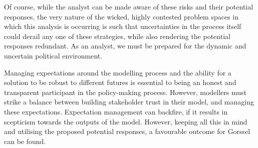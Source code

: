 Of course, while the analyst can be made aware of these risks and their potential responses, the very nature of the wicked, highly contested problem spaces in which this analysis is occurring is such that uncertainties in the process itself could derail any one of these strategies, while also rendering the potential responses redundant. As an analyst, we must be prepared for the dynamic and uncertain political environment. 

Managing expectations around the modelling process and the ability for a solution to be robust to different futures is essential to being an honest and transparent participant in the policy-making process. However, modellers must strike a balance between building stakeholder trust in their model, and managing these expectations. Expectation management can backfire, if it results in scepticism towards the outputs of the model. However, keeping all this in mind and utilising the proposed potential responses, a favourable outcome for Gorssel can be found.

